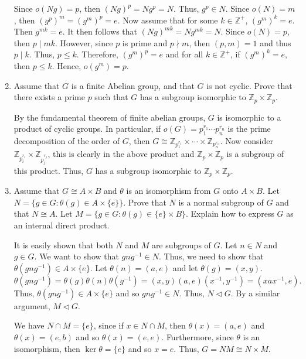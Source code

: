 \documentclass{article}
\makeatletter
\theoremstyle{definition}
\theoremstyle{remark}
\let\oldproofname=\proofname
\renewcommand{\proofname}{\bf{\textit{\oldproofname}}}
\theoremstyle{definition}
\renewenvironment{proof*}[1][\proofname]{\par
  \pushQED{\qed}%
  \normalfont \topsep6\p@\@plus6\p@\relax
  \list{}{\leftmargin=0mm
          \rightmargin=0mm
          \settowidth{\itemindent}{\itshape#1}%
          \labelwidth=\itemindent
          \parsep=0pt \listparindent=0mm%
  }
  \item[\hskip\labelsep
        \itshape
    #1\@addpunct{.}]\ignorespaces
}{%
  \popQED\endlist\@endpefalse
}
\makeatother
\begin{document}
\begin{enumerate}[leftmargin=*]
\begin{proof*}
                Since $o(Ng)=p$, then $(Ng)^p=Ng^p=N$. Thus, $g^p\in N$. Since $o(N)=m$, then $(g^p)^m=(g^m)^p=e$. Now assume that for some $k\in\mathbb{Z}^{+}$, $(g^m)^k=e$. Then $g^{mk}=e$. It then follows that $(Ng)^{mk}=Ng^{mk}=N$. Since $o(N)=p$, then $p\mid mk$. However, since $p$ is prime and $p\nmid m$, then $(p,m)=1$ and thus $p\mid k$. Thus, $p\leq k$. Therefore, $(g^m)^p=e$ and for all $k\in\mathbb{Z}^{+}$, if $(g^m)^k=e$, then $p\leq k$. Hence, $o(g^m)=p$.
            \end{proof*}
        \item Assume that $G$ is a finite Abelian group, and that $G$ is not cyclic. Prove that there exists a prime $p$ such that $G$ has a subgroup isomorphic to $\mathbb{Z}_p\times\mathbb{Z}_p$. 
            \begin{proof*}
                By the fundamental theorem of finite abelian groups, $G$ is isomorphic to a product of cyclic groups. In particular, if $o(G)=p_1^{r_1}\cdots p_n^{r_n}$ is the prime decomposition of the order of $G$, then $G\cong\mathbb{Z}_{p_1^{r_1}}\times\cdots\times\mathbb{Z}_{p_n^{r_n}}$. Now consider $\mathbb{Z}_{p_i^{r_i}}\times\mathbb{Z}_{p_j^{r_j}}$, this is clearly in the above product and $\mathbb{Z}_p\times\mathbb{Z}_p$ is a subgroup of this product. Thus, $G$ has a subgroup isomorphic to $\mathbb{Z}_p\times\mathbb{Z}_p$.
            \end{proof*}
        \item Assume that $G\cong A\times B$ and $\theta$ is an isomorphism from $G$ onto $A\times B$. Let $N=\{g\in G\colon \theta(g)\in A\times\{e\}\}$. Prove that $N$ is a normal subgroup of $G$ and that $N\cong A$. Let $M=\{g\in G\colon \theta(g)\in \{e\}\times B\}$. Explain how to express $G$ as an internal direct product.
            \begin{proof*}
                It is easily shown that both $N$ and $M$ are subgroups of $G$. Let $n\in N$ and $g\in G$. We want to show that $gng^{-1}\in N$. Thus, we need to show that $\theta(gng^{-1})\in A\times\{e\}$. Let $\theta(n)=(a,e)$ and let $\theta(g)=(x,y)$.
                    \begin{equation*}
                        \theta(gng^{-1})=\theta(g)\theta(n)\theta(g^{-1})=(x,y)(a,e)(x^{-1},y^{-1})=(xax^{-1},e).
                    \end{equation*}
                Thus, $\theta(gng^{-1})\in A\times\{e\}$ and so $gng^{-1}\in N$. Thus, $N\triangleleft G$. By a similar argument, $M\triangleleft G$.\par\hspace{4mm} We have $N\cap M=\{e\}$, since if $x\in N\cap M$, then $\theta(x)=(a,e)$ and $\theta(x)=(e,b)$ and so $\theta(x)=(e,e)$. Furthermore, since $\theta$ is an isomorphism, then $\ker\theta=\{e\}$ and so $x=e$. Thus, $G=NM\cong N\times M$.

\end{proof*}
\end{enumerate}
\end{document}
